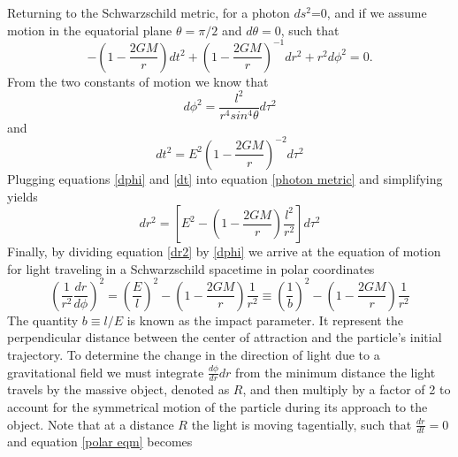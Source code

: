 \documentclass[a4paper,12pt]{article}
\begin{document}
Returning to the Schwarzschild metric, for a photon $ds^2$=0, and if we assume motion in the equatorial plane $\theta=\pi/2$ and $d \theta =0$, such that
\begin{equation} \label{photon metric}
-(1-\frac{2GM}{r})dt^2 + (1-\frac{2GM}{r})^{-1}dr^2+r^2 d\phi^2=0.
\end{equation}
From the two constants of motion we know that
\begin{equation} \label{dphi}
d\phi^2=\frac{l^2}{r^4 sin^4 \theta} d\tau^2
\end{equation}
and
\begin{equation} \label{dt}
dt^2=E^2(1-\frac{2GM}{r})^{-2}d\tau^2
\end{equation}
Plugging equations \ref{dphi} and \ref{dt} into equation \ref{photon metric} and simplifying yields
\begin{equation} \label{dr2}
dr^2=[E^2 - (1-\frac{2GM}{r}) \frac{l^2}{r^2}]d\tau^2
\end{equation} 
Finally, by dividing equation \ref{dr2} by \ref{dphi} we arrive at the equation of motion for light traveling in a Schwarzschild spacetime in polar coordinates
\begin{equation} \label{polar eqm}
(\frac{1}{r^2} \frac{dr}{d \phi})^2 = (\frac{E}{l})^2 - (1-\frac{2GM}{r})\frac{1}{r^2} \equiv (\frac{1}{b})^2 - (1-\frac{2GM}{r})\frac{1}{r^2}
\end{equation}
The quantity $b \equiv l/E$ is known as the impact parameter.  It represent the perpendicular distance between the center of attraction and the particle's initial trajectory.  To determine the change in the direction of light due to a gravitational field we must integrate $\frac{d\phi}{dr}dr $ from the minimum distance the light travels by the massive object, denoted as $R$, and then multiply by a factor of 2 to account for the symmetrical motion of the particle during its approach to the object. Note that at a distance $R$ the light is moving tagentially, such that $\frac{dr}{dt}=0$ and equation \ref{polar eqm} becomes
\end{document}
